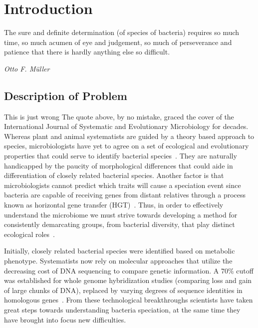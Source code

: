 \chapter{Introduction}
\begin{shadequote}
The sure and definite determination (of species of bacteria) requires so much time, so much acumen of eye and judgement, so much of perseverance and patience that there is hardly anything else so \mbox{difficult}. \par\emph{Otto F. M\"uller}
\end{shadequote}


\section{Description of Problem}
This is just wrong
The quote above, by no mistake, graced the cover of the International Journal of Systematic and Evolutionary Microbiology for decades.
Whereas plant and animal systematists are guided by a theory based approach to  species, microbiologists have yet to agree on a set of ecological and evolutionary properties that could serve to identify bacterial species~\cite{cohan2007systematics}.
They are naturally handicapped by the paucity of morphological differences that could aide in differentiation of closely related bacterial species.
Another factor is that microbiologists cannot predict which traits will cause a speciation event since bacteria are capable of receiving genes from distant relatives through a process known as horizontal gene transfer (HGT)~\cite{cohan2007systematics}.
Thus, in order to effectively understand the microbiome we must strive towards developing a method for consistently demarcating groups, from bacterial diversity, that play distinct ecological roles~\cite{koeppel2008identifying}.


Initially, closely related bacterial species were identified based on metabolic phenotype.
Systematists now rely on molecular approaches that utilize the decreasing cost of DNA sequencing to compare genetic information.
A 70\% cutoff was established for whole genome hybridization studies (comparing loss and gain of large chunks of DNA), replaced by varying degrees of sequence identities in homologous genes~\cite{cohan2007systematics,carlo}.
From these technological breakthroughs scientists have taken great steps towards understanding bacteria speciation, at the same time they have brought into focus new difficulties.


